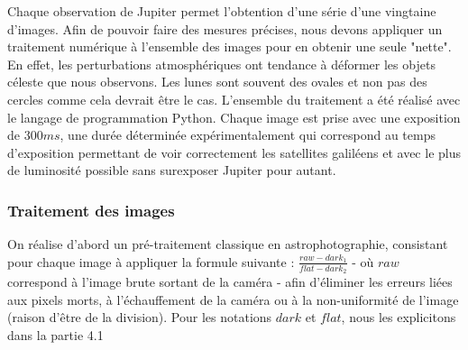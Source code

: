 \documentclass{aa}
\begin{document}
Chaque observation de Jupiter permet l'obtention d'une série d'une vingtaine d'images. Afin de pouvoir faire des mesures précises, nous devons appliquer un traitement numérique à l'ensemble des images pour en obtenir une seule "nette". En effet, les perturbations atmosphériques ont tendance à déformer les objets céleste que nous observons. Les lunes sont souvent des ovales et non pas des cercles comme cela devrait être le cas. L'ensemble du traitement a été réalisé avec le langage de programmation Python. Chaque image est prise avec une exposition de $300 ms$, une durée déterminée expérimentalement qui correspond au temps d'exposition permettant de voir correctement les satellites galiléens et avec le plus de luminosité possible sans surexposer Jupiter pour autant. \\


\subsubsection{Traitement des images}

On réalise d'abord un pré-traitement classique en astrophotographie, consistant pour chaque image à appliquer la formule suivante : $ \frac{raw-dark_1}{flat-dark_2} $ - où $raw$ correspond à l'image brute sortant de la caméra - afin d'éliminer les erreurs liées aux pixels morts, à l'échauffement de la caméra ou à la non-uniformité de l'image (raison d'être de la division). Pour les notations $dark$ et $flat$, nous les explicitons dans la partie 4.1 \\
\end{document}

